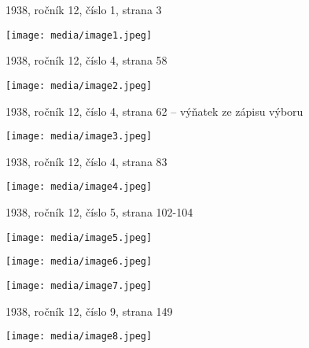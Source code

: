1938, ročník 12, číslo 1, strana 3

\texttt{[image: media/image1.jpeg]}

1938, ročník 12, číslo 4, strana 58

\texttt{[image: media/image2.jpeg]}

1938, ročník 12, číslo 4, strana 62 -- výňatek ze zápisu výboru

\texttt{[image: media/image3.jpeg]}

1938, ročník 12, číslo 4, strana 83

\texttt{[image: media/image4.jpeg]}

1938, ročník 12, číslo 5, strana 102-104

\texttt{[image: media/image5.jpeg]}

\texttt{[image: media/image6.jpeg]}

\texttt{[image: media/image7.jpeg]}

1938, ročník 12, číslo 9, strana 149

\texttt{[image: media/image8.jpeg]}
